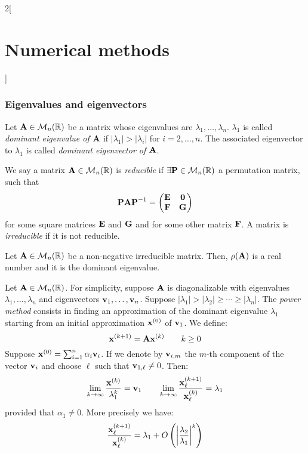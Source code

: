 \documentclass[../../../main.tex]{subfiles}
\begin{document}
\begin{multicols}{2}[\section{Numerical methods}]
    \subsubsection*{Eigenvalues and eigenvectors}
    \begin{definition}
        Let $\boldsymbol{\mathrm{A}}\in\mathcal{M}_n(\mathbb{R})$ be a matrix whose eigenvalues are $\lambda_1,\ldots,\lambda_n$. $\lambda_1$ is called \textit{dominant eigenvalue of $\boldsymbol{\mathrm{A}}$} if $|\lambda_1|>|\lambda_i|$ for $i=2,\ldots,n$. The associated eigenvector to $\lambda_1$ is called \textit{dominant eigenvector of $\boldsymbol{\mathrm{A}}$}.
    \end{definition}
    \begin{definition}
        We say a matrix $\boldsymbol{\mathrm{A}}\in\mathcal{M}_n(\mathbb{R})$ is \textit{reducible} if $\exists\boldsymbol{\mathrm{P}}\in\mathcal{M}_n(\mathbb{R})$ a permutation matrix, such that $$\boldsymbol{\mathrm{P}}\boldsymbol{\mathrm{A}}\boldsymbol{\mathrm{P}}^{-1}=
            \begin{pmatrix}
                \boldsymbol{\mathrm{E}} & \boldsymbol{\mathrm{0}} \\
                \boldsymbol{\mathrm{F}} & \boldsymbol{\mathrm{G}}
            \end{pmatrix}$$ for some square matrices $\boldsymbol{\mathrm{E}}$ and $\boldsymbol{\mathrm{G}}$ and for some other matrix $\boldsymbol{\mathrm{F}}$. A matrix is \textit{irreducible} if it is not reducible.
    \end{definition}
    \begin{theorem}
        Let $\boldsymbol{\mathrm{A}}\in\mathcal{M}_n(\mathbb{R})$ be a non-negative irreducible matrix. Then, $\rho(\boldsymbol{\mathrm{A}})$ is a real number and it is the dominant eigenvalue.
    \end{theorem}
    \begin{method}
        Let $\boldsymbol{\mathrm{A}}\in\mathcal{M}_n(\mathbb{R})$. For simplicity, suppose $\boldsymbol{\mathrm{A}}$ is diagonalizable with eigenvalues $\lambda_1,\ldots,\lambda_n$ and eigenvectors $\boldsymbol{\mathrm{v}}_1,\ldots,\boldsymbol{\mathrm{v}}_n$. Suppose $|\lambda_1|>|\lambda_2|\geq\cdots\geq|\lambda_n|$. The \textit{power method} consists in finding an approximation of the dominant eigenvalue $\lambda_1$ starting from an initial approximation $\boldsymbol{\mathrm{x}}^{(0)}$ of $\boldsymbol{\mathrm{v}}_1$. We define: $$\boldsymbol{\mathrm{x}}^{(k+1)}=\boldsymbol{\mathrm{A}}\boldsymbol{\mathrm{x}}^{(k)}\qquad k\geq 0$$ Suppose $\boldsymbol{\mathrm{x}}^{(0)}=\sum_{i=1}^n\alpha_i\boldsymbol{\mathrm{v}}_i$. If we denote by $\boldsymbol{\mathrm{v}}_{i,m}$ the $m$-th component of the vector $\boldsymbol{\mathrm{v}}_i$ and choose $\ell$ such that $\boldsymbol{\mathrm{v}}_{1,\ell}\ne0$. Then: $$\lim_{k\to\infty}\frac{\boldsymbol{\mathrm{x}}^{(k)}}{\lambda_1^k}=\boldsymbol{\mathrm{v}}_1\qquad\lim_{k\to\infty}\frac{\boldsymbol{\mathrm{x}}_\ell^{(k+1)}}{\boldsymbol{\mathrm{x}}_\ell^{(k)}}=\lambda_1$$ provided that $\alpha_1\ne0$. More precisely we have: $$\frac{\boldsymbol{\mathrm{x}}_\ell^{(k+1)}}{\boldsymbol{\mathrm{x}}_\ell^{(k)}}=\lambda_1+O\left(\left|\frac{\lambda_2}{\lambda_1}\right|^k\right)$$

\end{method}
\end{multicols}
\end{document}
